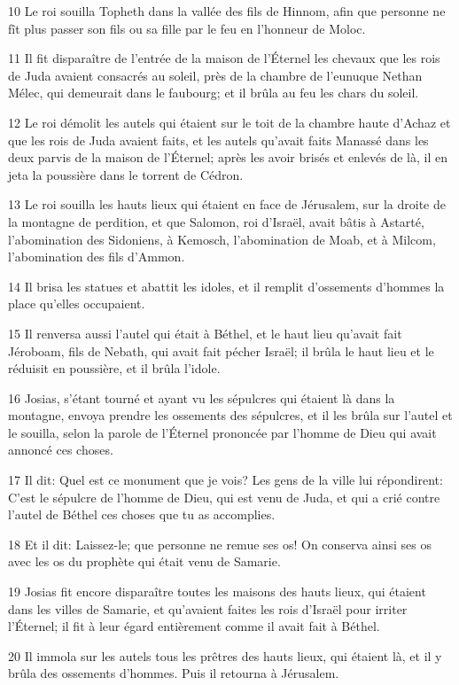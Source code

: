 \par 10 Le roi souilla Topheth dans la vallée des fils de Hinnom, afin que personne ne fît plus passer son fils ou sa fille par le feu en l'honneur de Moloc.
\par 11 Il fit disparaître de l'entrée de la maison de l'Éternel les chevaux que les rois de Juda avaient consacrés au soleil, près de la chambre de l'eunuque Nethan Mélec, qui demeurait dans le faubourg; et il brûla au feu les chars du soleil.
\par 12 Le roi démolit les autels qui étaient sur le toit de la chambre haute d'Achaz et que les rois de Juda avaient faits, et les autels qu'avait faits Manassé dans les deux parvis de la maison de l'Éternel; après les avoir brisés et enlevés de là, il en jeta la poussière dans le torrent de Cédron.
\par 13 Le roi souilla les hauts lieux qui étaient en face de Jérusalem, sur la droite de la montagne de perdition, et que Salomon, roi d'Israël, avait bâtis à Astarté, l'abomination des Sidoniens, à Kemosch, l'abomination de Moab, et à Milcom, l'abomination des fils d'Ammon.
\par 14 Il brisa les statues et abattit les idoles, et il remplit d'ossements d'hommes la place qu'elles occupaient.
\par 15 Il renversa aussi l'autel qui était à Béthel, et le haut lieu qu'avait fait Jéroboam, fils de Nebath, qui avait fait pécher Israël; il brûla le haut lieu et le réduisit en poussière, et il brûla l'idole.
\par 16 Josias, s'étant tourné et ayant vu les sépulcres qui étaient là dans la montagne, envoya prendre les ossements des sépulcres, et il les brûla sur l'autel et le souilla, selon la parole de l'Éternel prononcée par l'homme de Dieu qui avait annoncé ces choses.
\par 17 Il dit: Quel est ce monument que je vois? Les gens de la ville lui répondirent: C'est le sépulcre de l'homme de Dieu, qui est venu de Juda, et qui a crié contre l'autel de Béthel ces choses que tu as accomplies.
\par 18 Et il dit: Laissez-le; que personne ne remue ses os! On conserva ainsi ses os avec les os du prophète qui était venu de Samarie.
\par 19 Josias fit encore disparaître toutes les maisons des hauts lieux, qui étaient dans les villes de Samarie, et qu'avaient faites les rois d'Israël pour irriter l'Éternel; il fit à leur égard entièrement comme il avait fait à Béthel.
\par 20 Il immola sur les autels tous les prêtres des hauts lieux, qui étaient là, et il y brûla des ossements d'hommes. Puis il retourna à Jérusalem.
